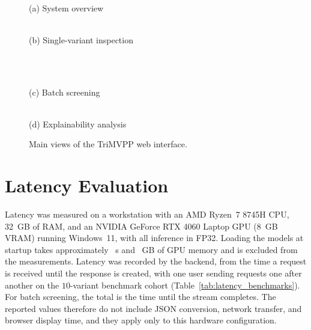 \begin{figure}[htbp]
    \centering
    \begin{minipage}{0.48\textwidth}\centering
        \\[2pt]
        \small (a) System overview
    \end{minipage}\hfill
    \begin{minipage}{0.48\textwidth}\centering
        \\[2pt]
        \small (b) Single-variant inspection
    \end{minipage}\\[8pt]
    \begin{minipage}{0.48\textwidth}\centering
        \\[2pt]
        \small (c) Batch screening
    \end{minipage}\hfill
    \begin{minipage}{0.48\textwidth}\centering
        \\[2pt]
        \small (d) Explainability analysis
    \end{minipage}
    \caption{Main views of the TriMVPP web interface.}
    \label{fig:web_interface}
\end{figure}

\section{Latency Evaluation}
\label{sec:latency}

Latency was measured on a workstation with an AMD Ryzen~7 8745H CPU, 32~GB of RAM, and an NVIDIA GeForce RTX 4060 Laptop GPU (8~GB VRAM) running Windows~11, with all inference in FP32. Loading the models at startup takes approximately \tbd{}~s and \tbd{}~GB of GPU memory and is excluded from the measurements. %
Latency was recorded by the backend, from the time a request is received until the response is created, with one user sending requests one after another on the $10$-variant benchmark cohort (Table~\ref{tab:latency_benchmarks}). For batch screening, the total is the time until the stream completes. The reported values therefore do not include JSON conversion, network transfer, and browser display time, and they apply only to this hardware configuration.

